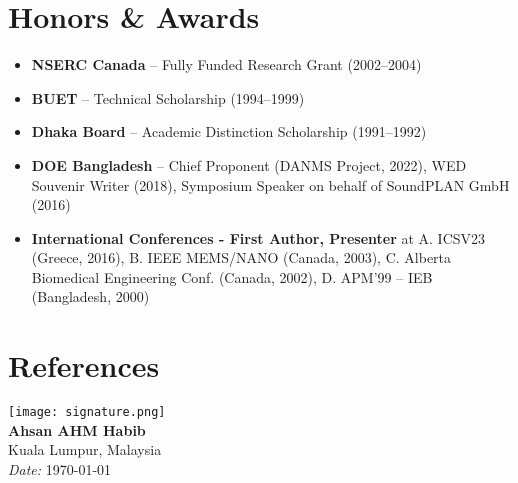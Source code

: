 \documentclass[11pt,a4paper]{moderncv}
\begin{document}
\section{Honors \& Awards}
\begin{itemize}
    \item \textbf{NSERC Canada} – Fully Funded Research Grant (2002–2004)
    \item \textbf{BUET} – Technical Scholarship (1994–1999)
    \item \textbf{Dhaka Board} – Academic Distinction Scholarship (1991–1992)
    \item \textbf{DOE Bangladesh} – Chief Proponent (DANMS Project, 2022), WED Souvenir Writer (2018), Symposium Speaker on behalf of SoundPLAN GmbH (2016)
    \item \textbf{International Conferences - First Author, Presenter} at A.  ICSV23 (Greece, 2016), B. IEEE MEMS/NANO (Canada, 2003), C. Alberta Biomedical Engineering Conf. (Canada, 2002), D. APM'99 – IEB (Bangladesh, 2000)
\end{itemize}

\section{References}

\vspace{2em}
\texttt{[image: signature.png]}\\
\textbf{Ahsan AHM Habib}\\
Kuala Lumpur, Malaysia \\
\textit{Date:} \today
\end{document}
